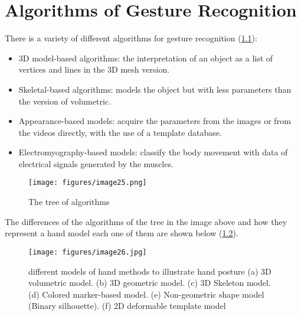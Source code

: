 \documentclass[12pt]{book}
\begin{document}
\chapter{Algorithms of Gesture Recognition}
There is a variety of different algorithms for gesture recognition (\ref{fig:fig17}):
\begin{itemize}
    \item 3D model-based algorithms: the interpretation of an object as a list of vertices and lines in the 3D mesh version.
    \item Skeletal-based algorithms: models the object but with less parameters than the version of volumetric. 
    \item Appearance-based models: acquire the parameters from the images or from the videos directly, with the use of a template database.
    \item Electromyography-based models:  classify the body movement with data of electrical signals generated by the muscles.
\end{itemize}

\begin{figure}[!htbp]
\centering
  \texttt{[image: figures/image25.png]}
  \\
  \caption{The tree of algorithms}
  \label{fig:fig17}
\end{figure}

The differences of the algorithms of the tree in the image above and how they represent a hand model each one of them are shown below (\ref{fig:fig18}). 

\begin{figure}[!htbp]
\centering
  \texttt{[image: figures/image26.jpg]}
  \\
  \caption{different models of hand methods to illustrate hand posture (a) 3D volumetric model. (b) 3D geometric model. (c) 3D Skeleton model. (d) Colored marker-based model. (e) Non-geometric shape model (Binary silhouette). (f) 2D deformable template model \cite{RAF2012}}
  \label{fig:fig18}
\end{figure}
\end{document}
